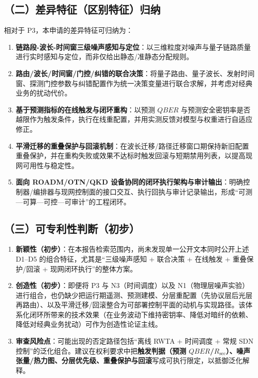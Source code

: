 \documentclass[12pt,a4paper]{article}
\begin{document}
\subsection*{（二）差异特征（区别特征）归纳}

相对于 P3，本申请的差异特征可归纳为：
\begin{enumerate}[label=(D\arabic*)]
    \item \textbf{链路段-波长-时间窗三级噪声感知与定位}：以三维粒度对噪声与量子链路质量进行实时感知与定位，而非仅给出静态/准静态分配规则。
    \item \textbf{路由/波长/时间窗/门控/纠错的联合决策}：将量子路由、量子波长、发射时间窗、探测门控参数与纠错配置作为统一决策变量进行联合求解，并考虑对经典业务的扰动代价。
    \item \textbf{基于预测指标的在线触发与闭环重构}：以预测 $QBER$ 与预测安全密钥率是否越限作为触发条件，执行在线重配置，并用实测反馈对模型与权重进行自适应修正。
    \item \textbf{平滑迁移的重叠保护与回滚机制}：在波长迁移/路径迁移窗口期保持新旧配置重叠保护，并在重构失败或效果不达标时触发回滚与短期禁用列表，以提高现网可用性与稳定性。
    \item \textbf{面向 ROADM/OTN/QKD 设备协同的闭环执行架构与审计输出}：明确控制器/编排器与现网控制面的接口交互、执行回执与审计记录输出，形成“可测---可算---可控---可审计”的工程闭环。
\end{enumerate}

\subsection*{（三）可专利性判断（初步）}

\begin{enumerate}[label=(\arabic*)]
    \item \textbf{新颖性（初步）}：在本报告检索范围内，尚未发现单一公开文本同时公开上述 D1--D5 的组合特征，尤其是“三级噪声感知 + 联合决策 + 在线触发 + 重叠保护/回滚 + 现网闭环执行”的整体方案。
    \item \textbf{创造性（初步）}：即便将 P3 与 N3（时间调度）以及 N1（物理层噪声实验）进行组合，也仍缺少把运行期遥测、预测建模、分层重配置（先协议层后光层再路由）、以及平滑迁移/回滚整合为可部署控制平面的动机与实现路径。该体系化闭环所带来的技术效果（在业务波动下维持密钥率、降低对暗纤的依赖、降低对经典业务扰动）可作为创造性论证主线。
    \item \textbf{审查风险点}：可能出现的否定路径包括“离线 RWTA + 时间调度 + 常规 SDN 控制”的泛化组合。建议在权利要求中把\textbf{触发判据（预测 $QBER$/$R_{\mathrm{sec}}$）、噪声张量/热力图、分层优先级、重叠保护与回滚}写成可执行限定，以抵御泛化解释。
\end{enumerate}
\end{document}

